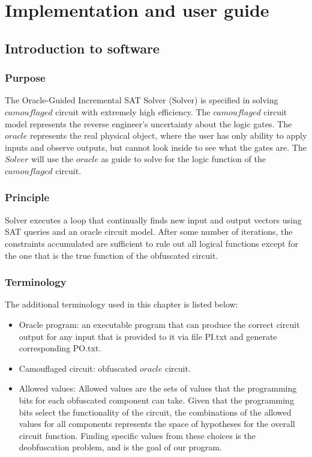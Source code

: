\documentclass[thesis]{umassthesis}  %
\begin{document}
\chapter{Implementation and user guide}

\section{Introduction to software}
	\subsection{Purpose}
	The Oracle-Guided Incremental SAT Solver (Solver) is specified in solving $camouflaged$ circuit with extremely high efficiency. The $camouflaged$ circuit model represents the reverse engineer's uncertainty about the logic gates. The $oracle$ represents the real physical object, where the user has only ability to apply inputs and observe outputs, but cannot look inside to see what the gates are. The $Solver$ will use the $oracle$ as guide to solve for the logic function of the $camouflaged$ circuit. 	
	\subsection{Principle} 
	Solver executes a loop that continually finds new input and output vectors using SAT queries and an oracle circuit model. After some number of iterations, the constraints accumulated are sufficient to rule out all logical functions except for the one that is the true function of the obfuscated circuit. 
	\subsection{Terminology}
		The additional terminology used in this chapter is listed below: 
		\begin{itemize}
			\item Oracle program: an executable program that can produce the correct circuit output for any input that is provided to it via file PI.txt and generate corresponding PO.txt.
			\item Camouflaged circuit: obfuscated $oracle$ circuit.
			\item Allowed values: Allowed values are the sets of values that the programming bits for each obfuscated component can take. Given that the programming bits select the functionality of the circuit, the combinations of the allowed values for all components represents the space of hypotheses for the overall circuit function. Finding specific values from these choices is the deobfuscation problem, and is the goal of our program.
		\end{itemize}
\end{document}
